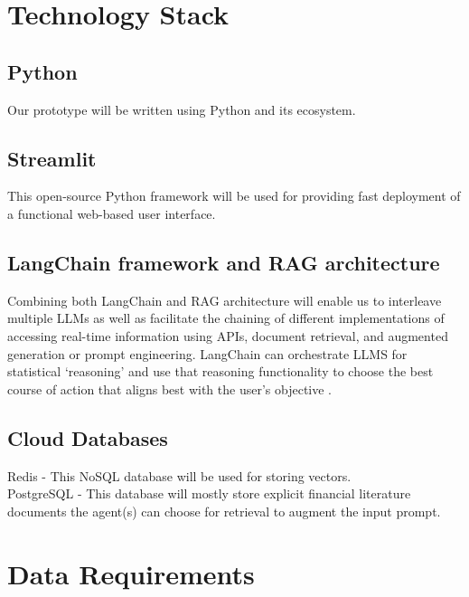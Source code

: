 \documentclass{article}
\begin{document}
\section{Technology Stack}
\subsection{Python}
Our prototype will be written using Python and its ecosystem.

\subsection{Streamlit}
This open-source Python framework will be used for providing fast deployment of a functional web-based user interface.

\subsection{LangChain framework and RAG architecture}
Combining both LangChain and RAG architecture will enable us to interleave multiple LLMs as well as facilitate the chaining of different implementations of accessing real-time information using APIs, document retrieval, and augmented generation or prompt engineering. LangChain can orchestrate LLMS for statistical ‘reasoning’ and use that reasoning functionality to choose the best course of action that aligns best with the user’s objective \parencite{yao_react_2023}.

\subsection{Cloud Databases}
Redis - This NoSQL database will be used for storing vectors. \\
PostgreSQL - This database will mostly store explicit financial literature documents the agent(s) can choose for retrieval to augment the input prompt.


\section{Data Requirements}
\end{document}
